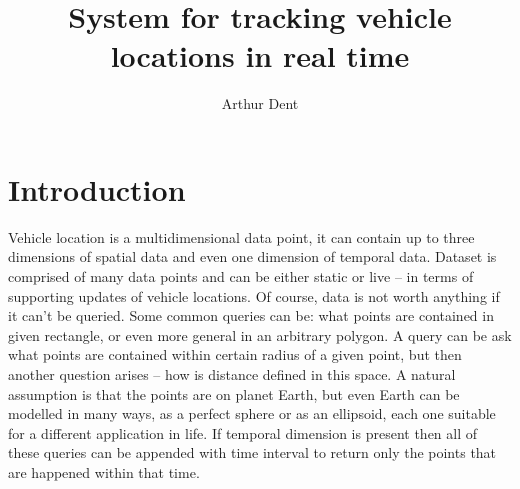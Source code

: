 \documentclass[times, utf8, diplomski]{fer}
\begin{document}

\title{System for tracking vehicle locations in real time}

\author{Arthur Dent}

\maketitle

\izvornik

\zahvala{}

\tableofcontents















\chapter{Introduction}
Vehicle location is a multidimensional data point, it can contain up to three dimensions of spatial data and even one dimension of temporal data. Dataset is comprised of many data points and can be either static or live -- in terms of supporting updates of vehicle locations. Of course, data is not worth anything if it can't be queried. Some common queries can be: what points are contained in given rectangle, or even more general in an arbitrary polygon. A query can be ask what points are contained within certain radius of a given point, but then another question arises -- how is distance defined in this space. A natural assumption is that the points are on planet Earth, but even Earth can be modelled in many ways, as a perfect sphere or as an ellipsoid, each one suitable for a different application in life. If temporal dimension is present then all of these queries can be appended with time interval to return only the points that are happened within that time.

\end{document}
